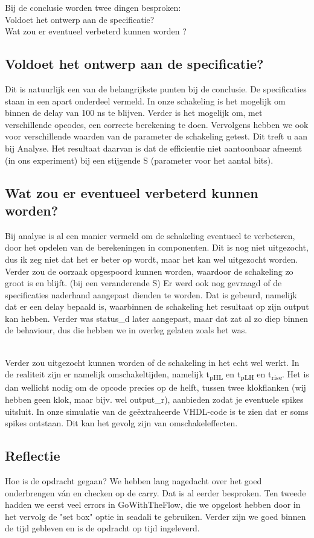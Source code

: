 \documentclass{article}
\begin{document}
\newcommand{\tss}{\textsubscript}
Bij de conclusie worden twee dingen besproken: \\
Voldoet het ontwerp aan de specificatie? \\
Wat zou er eventueel verbeterd kunnen worden ?
\subsection{Voldoet het ontwerp aan de specificatie?}
Dit is natuurlijk een van de belangrijkste punten bij de conclusie. De specificaties staan in een apart onderdeel vermeld. In onze schakeling is het mogelijk om binnen de delay van 100 ns te blijven. Verder is het mogelijk om, met verschillende opcodes, een correcte berekening te doen. Vervolgens hebben we ook voor verschillende waarden van de parameter de schakeling getest. Dit treft u aan bij Analyse. Het resultaat daarvan is dat de efficientie niet aantoonbaar afneemt (in ons experiment) bij een stijgende S (parameter voor het aantal bits). \newline \\
 \subsection{Wat zou er eventueel verbeterd kunnen worden?}
Bij analyse is al een manier vermeld om de schakeling eventueel te verbeteren, door het opdelen van de berekeningen in componenten. Dit is nog niet uitgezocht, dus ik zeg niet dat het er beter op wordt, maar het kan wel uitgezocht worden. 
Verder zou de oorzaak opgespoord kunnen worden, waardoor de schakeling zo groot is en blijft. (bij een veranderende S)
Er werd ook nog gevraagd of de specificaties naderhand aangepast dienden te worden. Dat is gebeurd, namelijk dat er een delay bepaald is, waarbinnen de schakeling het resultaat op zijn output kan hebben. Verder was status_d later aangepast, maar dat zat al zo diep binnen de behaviour, dus die hebben we in overleg gelaten zoals het was. 


 \newline \\
Verder zou uitgezocht kunnen worden of de schakeling in het echt wel werkt. In de realiteit zijn er namelijk omschakeltijden, namelijk t\tss{pHL} en t\tss{pLH} en t\tss{rise}. Het is dan wellicht nodig om de opcode precies op de helft,  tussen twee klokflanken (wij hebben geen klok, maar bijv. wel output\_r), aanbieden zodat je eventuele spikes uitsluit.  In onze simulatie van de geëxtraheerde VHDL-code is te zien dat er soms spikes ontstaan. Dit kan het gevolg zijn van omschakeleffecten. \newline \\
\subsection{Reflectie}
Hoe is de opdracht gegaan? We hebben lang nagedacht over het goed onderbrengen ván en checken op de carry. Dat is al eerder besproken. Ten tweede hadden we eerst veel errors in GoWithTheFlow, die we opgelost hebben door in het vervolg de "set box" optie in seadali te gebruiken. Verder zijn we goed binnen de tijd gebleven en is de opdracht op tijd ingeleverd. 
\end{document}
